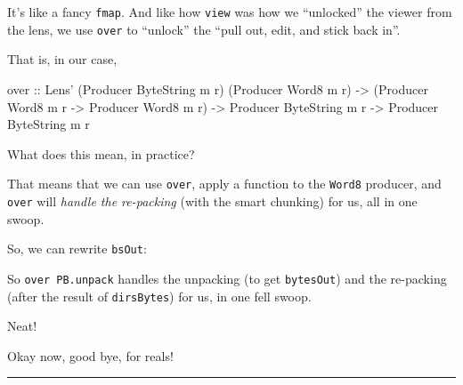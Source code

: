 \documentclass[]{article}
\newenvironment{Shaded}{}{}
\newcommand{\DataTypeTok}[1]{\textcolor[rgb]{0.56,0.13,0.00}{#1}}
\newcommand{\FunctionTok}[1]{\textcolor[rgb]{0.02,0.16,0.49}{#1}}
\newcommand{\NormalTok}[1]{#1}
\newcommand{\OtherTok}[1]{\textcolor[rgb]{0.00,0.44,0.13}{#1}}
\begin{document}
It's like a fancy \texttt{fmap}. And like how \texttt{view} was how we
``unlocked'' the viewer from the lens, we use \texttt{over} to ``unlock'' the
``pull out, edit, and stick back in''.

That is, in our case,

\begin{Shaded}
\begin{Highlighting}[]
\OtherTok{over ::} \DataTypeTok{Lens'}\NormalTok{ (}\DataTypeTok{Producer} \DataTypeTok{ByteString}\NormalTok{ m r) (}\DataTypeTok{Producer} \DataTypeTok{Word8}\NormalTok{ m r)}
     \OtherTok{->}\NormalTok{ (}\DataTypeTok{Producer} \DataTypeTok{Word8}\NormalTok{ m r }\OtherTok{->} \DataTypeTok{Producer} \DataTypeTok{Word8}\NormalTok{ m r)}
     \OtherTok{->} \DataTypeTok{Producer} \DataTypeTok{ByteString}\NormalTok{ m r}
     \OtherTok{->} \DataTypeTok{Producer} \DataTypeTok{ByteString}\NormalTok{ m r}
\end{Highlighting}
\end{Shaded}

What does this mean, in practice?

That means that we can use \texttt{over}, apply a function to the \texttt{Word8}
producer, and \texttt{over} will \emph{handle the re-packing} (with the smart
chunking) for us, all in one swoop.

So, we can rewrite \texttt{bsOut}:

\begin{Shaded}
\end{Shaded}

So \texttt{over\ PB.unpack} handles the unpacking (to get \texttt{bytesOut}) and
the re-packing (after the result of \texttt{dirsBytes}) for us, in one fell
swoop.

Neat!

Okay now, good bye, for reals!

\begin{center}\rule{0.5\linewidth}{\linethickness}\end{center}
\end{document}
